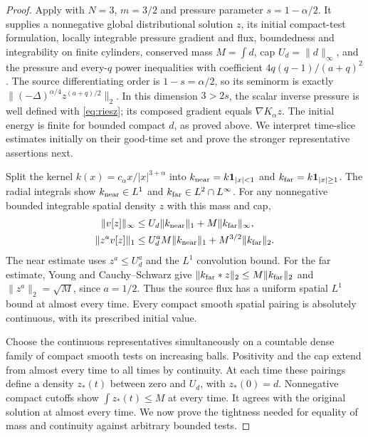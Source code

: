 \begin{proof}
Apply \cite[Definition~2.1 and Theorem~2.2]{Stan2016} with
$N=3$, $m=3/2$ and pressure parameter $s=1-\alpha/2$.
It supplies a nonnegative global distributional solution $z$, its initial
compact-test formulation, locally integrable pressure gradient and flux,
boundedness and integrability on finite cylinders, conserved mass
$M=\int d$, cap $U_d=\|d\|_\infty$, and the pressure and every-$q$
power inequalities with coefficient $4q(q-1)/(a+q)^2$.
The source differentiating order is $1-s=\alpha/2$, so its seminorm is
exactly $\|(-\Delta)^{\alpha/4}z^{(a+q)/2}\|_2$.
In this dimension $3>2s$, the scalar inverse pressure is well defined
with \eqref{eq:riesz}; its composed gradient equals $\nabla K_\alpha z$.
The initial energy is finite for bounded compact $d$, as proved above.
We interpret time-slice estimates initially on their good-time set and
prove the stronger representative assertions next.

Split the kernel $k(x)=c_\alpha x/|x|^{3+\alpha}$ into
$k_{\rm near}=k\mathbf1_{|x|<1}$ and
$k_{\rm far}=k\mathbf1_{|x|\geq1}$. The radial integrals show
$k_{\rm near}\in L^1$ and
$k_{\rm far}\in L^2\cap L^\infty$. For any nonnegative bounded
integrable spatial density $z$ with this mass and cap,
\begin{align}
 \|v[z]\|_\infty&\leq U_d\|k_{\rm near}\|_1
                         +M\|k_{\rm far}\|_\infty,\nonumber\\
 \|z^av[z]\|_1&\leq U_d^aM\|k_{\rm near}\|_1
                         +M^{3/2}\|k_{\rm far}\|_2.\label{eq:global-flux}
\end{align}
The near estimate uses $z^a\leq U_d^a$ and the $L^1$ convolution bound.
For the far estimate, Young and Cauchy--Schwarz give
$\|k_{\rm far}*z\|_2\leq M\|k_{\rm far}\|_2$ and
$\|z^a\|_2=\sqrt M$, since $a=1/2$.
Thus the source flux has a uniform spatial $L^1$ bound at almost every
time. Every compact smooth spatial pairing is absolutely continuous,
with its prescribed initial value.

Choose the continuous representatives simultaneously on a countable
dense family of compact smooth tests on increasing balls. Positivity
and the cap extend from almost every time to all times by continuity.
At each time these pairings define a density $z_*(t)$ between zero and
$U_d$, with $z_*(0)=d$. Nonnegative compact cutoffs show
$\int z_*(t)\leq M$ at every time. It agrees with the original solution
at almost every time. We now prove the tightness needed for equality of
mass and continuity against arbitrary bounded tests.


\end{proof}

